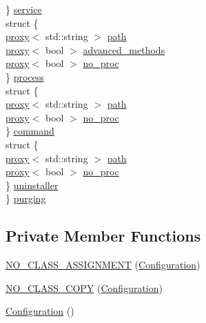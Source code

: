 \begin{DoxyCompactItemize}
\begin{tabbing}
\>\} \hyperlink{class_configuration_a32cc3bce5634709d4e715d3e3bdce2f8}{service}\\
\>struct \{\\
\>\>\hyperlink{class_configuration_1_1proxy}{proxy}$<$ std::string $>$ \hyperlink{class_configuration_ae06f5de56549c051253ffb15b61fc9e1}{path}\\
\>\>\hyperlink{class_configuration_1_1proxy}{proxy}$<$ bool $>$ \hyperlink{class_configuration_ad5b3264a2ff25f35f3b8b613de3afebb}{advanced\_methods}\\
\>\>\hyperlink{class_configuration_1_1proxy}{proxy}$<$ bool $>$ \hyperlink{class_configuration_a2576d3337ca3f4c08a45553fea1b7e9c}{no\_proc}\\
\>\} \hyperlink{class_configuration_ac08617fdea40a061a02cf031d4f5ef83}{process}\\
\>struct \{\\
\>\>\hyperlink{class_configuration_1_1proxy}{proxy}$<$ std::string $>$ \hyperlink{class_configuration_ae06f5de56549c051253ffb15b61fc9e1}{path}\\
\>\>\hyperlink{class_configuration_1_1proxy}{proxy}$<$ bool $>$ \hyperlink{class_configuration_a2576d3337ca3f4c08a45553fea1b7e9c}{no\_proc}\\
\>\} \hyperlink{class_configuration_ace1bd383aba01e8720f40859bcefcb35}{command}\\
\>struct \{\\
\>\>\hyperlink{class_configuration_1_1proxy}{proxy}$<$ std::string $>$ \hyperlink{class_configuration_ae06f5de56549c051253ffb15b61fc9e1}{path}\\
\>\>\hyperlink{class_configuration_1_1proxy}{proxy}$<$ bool $>$ \hyperlink{class_configuration_a2576d3337ca3f4c08a45553fea1b7e9c}{no\_proc}\\
\>\} \hyperlink{class_configuration_a3df7bf4e745ba524e2b19ee390ca1847}{uninstaller}\\
\} \hyperlink{class_configuration_a2110685ec9c2617514b1f1de96b5bf0a}{purging}\\

\end{tabbing}\end{DoxyCompactItemize}
\subsection*{Private Member Functions}
\begin{DoxyCompactItemize}
\item 
\hyperlink{class_configuration_a85e9394e6aa827ff48737aa7d5264bbf}{N\-O\-\_\-\-C\-L\-A\-S\-S\-\_\-\-A\-S\-S\-I\-G\-N\-M\-E\-N\-T} (\hyperlink{class_configuration}{Configuration})
\item 
\hyperlink{class_configuration_a3b21747afa5ce76cfc6908c4f815a5d9}{N\-O\-\_\-\-C\-L\-A\-S\-S\-\_\-\-C\-O\-P\-Y} (\hyperlink{class_configuration}{Configuration})
\item 
\hyperlink{class_configuration_a779947337bf652f0e773cb29f37f14ba}{Configuration} ()
\end{DoxyCompactItemize}
